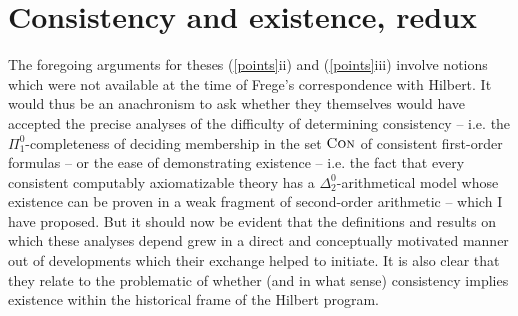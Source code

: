 \documentclass[11pt,fleqn,leqno]{article}
\begin{document}
\section{Consistency and existence, redux}

The foregoing arguments for theses (\ref{points}ii) and (\ref{points}iii) involve notions which were not available at the time of Frege's correspondence with Hilbert.   It would thus be an anachronism to ask whether they themselves would have accepted the precise analyses of the difficulty of determining consistency -- i.e. the $\Pi^0_1$-completeness of deciding membership in the set $\textsc{Con}$ of consistent first-order formulas -- or the ease of demonstrating existence -- i.e. the fact that every consistent computably axiomatizable theory has a $\Delta^0_2$-arithmetical model whose existence can be proven in a weak fragment of second-order arithmetic -- which I have proposed.   But it should now be evident that the definitions and results on which these analyses depend grew in a direct and conceptually motivated manner out of developments which their exchange helped to initiate.  It is also clear that they relate to the  problematic of whether (and in what sense) consistency implies existence within the historical frame of the Hilbert program.
\end{document}
